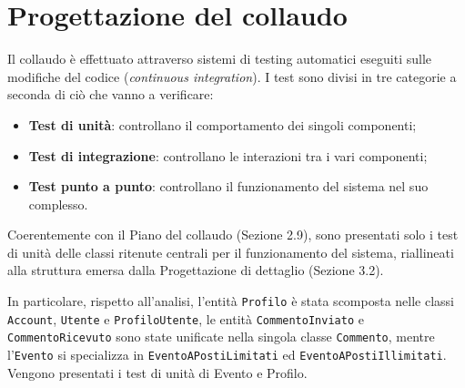 \documentclass[12pt,a4paper]{report}
\begin{document}
\section{Progettazione del collaudo}
Il collaudo è effettuato attraverso sistemi di testing automatici eseguiti sulle
modifiche del codice (\emph{continuous integration}). I test sono divisi in tre
categorie a seconda di ciò che vanno a verificare:
\begin{itemize}
    \item \textbf{Test di unità}: controllano il comportamento dei singoli componenti;
    \item \textbf{Test di integrazione}: controllano le interazioni tra i vari componenti;
    \item \textbf{Test punto a punto}: controllano il funzionamento del sistema nel suo
          complesso.
\end{itemize}
Coerentemente con il Piano del collaudo (Sezione 2.9), sono presentati
solo i test di unità delle classi ritenute centrali per il funzionamento del sistema,
riallineati alla struttura emersa dalla Progettazione di dettaglio (Sezione 3.2).

In particolare, rispetto all'analisi, l'entità \texttt{Profilo} è stata scomposta
nelle classi \texttt{Account}, \texttt{Utente} e \texttt{ProfiloUtente}, le entità
\texttt{CommentoInviato} e \texttt{CommentoRicevuto} sono state unificate nella
singola classe \texttt{Commento}, mentre l'\texttt{Evento} si specializza in
\texttt{EventoAPostiLimitati} ed \texttt{EventoAPostiIllimitati}. Vengono presentati
i test di unità di Evento e Profilo.
\end{document}
